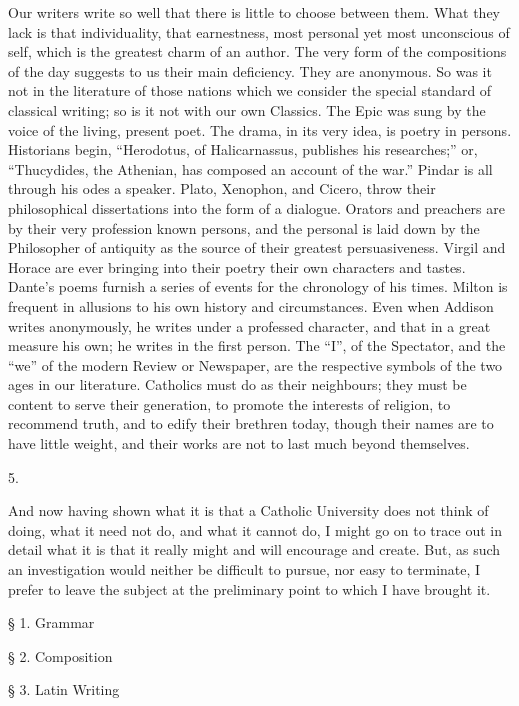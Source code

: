 Our writers write so well that there is little to choose between
them. What they lack is that individuality, that earnestness, most
personal yet most unconscious of self, which is the greatest charm of
an author. The very form of the compositions of the day suggests to us
their main deficiency. They are anonymous. So was it not in the
literature of those nations which we consider the special standard of
classical writing; so is it not with our own Classics. The Epic was
sung by the voice of the living, present poet. The drama, in its very
idea, is poetry in persons. Historians begin, ``Herodotus, of
Halicarnassus, publishes his researches;'' or, ``Thucydides,
the Athenian, has composed an account of the war.'' Pindar is all
through his odes a speaker. Plato, Xenophon, and Cicero, throw their
philosophical dissertations into the form of a dialogue. Orators and
preachers are by their very profession known persons, and the personal
is laid down by the Philosopher of antiquity as the source of their
greatest persuasiveness. Virgil and Horace are ever bringing into
their poetry their own characters and tastes. Dante's poems furnish a
series of events for the chronology of his times. Milton is frequent
in allusions to his own history and circumstances. Even when Addison
writes anonymously, he writes under a professed character, and that in
a great measure his own; he writes in the first person. The
``I'', of the Spectator, and the ``we'' of the modern
Review or Newspaper, are the respective symbols of the two ages in our
literature. Catholics must do as their neighbours; they must be
content to serve their generation, to promote the interests of
religion, to recommend truth, and to edify their brethren today,
though their names are to have little weight, and their works are not
to last much beyond themselves.

5.

And now having shown what it is that a Catholic University does not
think of doing, what it need not do, and what it cannot do, I might go
on to trace out in detail what it is that it really might and will
encourage and create. But, as such an investigation would neither be
difficult to pursue, nor easy to terminate, I prefer to leave the
subject at the preliminary point to which I have brought it.


§ 1. Grammar

§ 2. Composition

§ 3. Latin Writing

